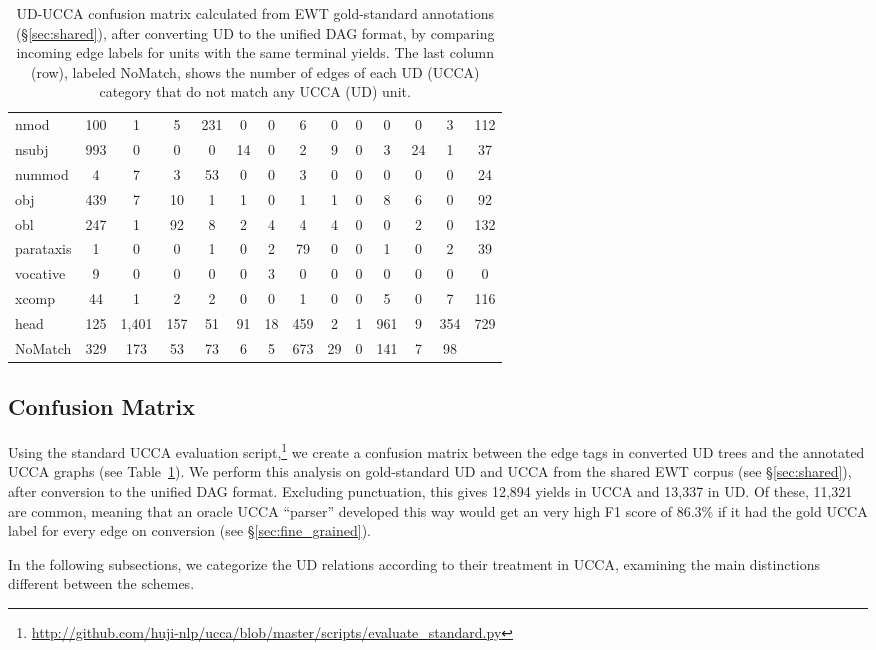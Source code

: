 \documentclass[11pt,a4paper]{article}
\begin{document}
\begin{table}[t]
\begin{tabular}{l|ccccccccccccc}
nmod & 100 & 1 & 5 & 231 & 0 & 0 & 6 & 0 & 0 & 0 & 0 & 3 & 112 \\
nsubj & 993 & 0 & 0 & 0 & 14 & 0 & 2 & 9 & 0 & 3 & 24 & 1 & 37 \\
nummod & 4 & 7 & 3 & 53 & 0 & 0 & 3 & 0 & 0 & 0 & 0 & 0 & 24 \\
obj & 439 & 7 & 10 & 1 & 1 & 0 & 1 & 1 & 0 & 8 & 6 & 0 & 92 \\
obl & 247 & 1 & 92 & 8 & 2 & 4 & 4 & 4 & 0 & 0 & 2 & 0 & 132 \\
parataxis & 1 & 0 & 0 & 1 & 0 & 2 & 79 & 0 & 0 & 1 & 0 & 2 & 39 \\
vocative & 9 & 0 & 0 & 0 & 0 & 3 & 0 & 0 & 0 & 0 & 0 & 0 & 0 \\
xcomp & 44 & 1 & 2 & 2 & 0 & 0 & 1 & 0 & 0 & 5 & 0 & 7 & 116 \\
head & 125 & 1,401 & 157 & 51 & 91 & 18 & 459 & 2 & 1 & 961 & 9 & 354 & 729 \\
{\sc NoMatch} & 329 & 173 & 53 & 73 & 6 & 5 & 673 & 29 & 0 & 141 & 7 & 98
\end{tabular}
\caption{UD-UCCA confusion matrix calculated from EWT
gold-standard annotations (\S\ref{sec:shared}),
after converting UD to the unified DAG format,
by comparing incoming edge labels for units with the same terminal yields.
The last column (row), labeled {\sc NoMatch}, shows the number of edges of each UD (UCCA) category
that do not match any UCCA (UD) unit.
\label{tab:confusion_matrix}}
\end{table}

\subsection{Confusion Matrix}\label{sec:confusion}

Using the standard UCCA evaluation
script,\footnote{\url{http://github.com/huji-nlp/ucca/blob/master/scripts/evaluate_standard.py}}
we create a confusion matrix between the edge tags in converted UD trees
and the annotated UCCA graphs (see Table~\ref{tab:confusion_matrix}).
We perform this analysis on gold-standard UD and UCCA from the shared EWT corpus
(see \S\ref{sec:shared}),
after conversion to the unified DAG format.
Excluding punctuation, this gives 12,894 yields in UCCA and
13,337 in UD.
Of these, 11,321 are common, meaning that an oracle UCCA ``parser'' developed this way
would get an very high F1 score
of 86.3\% if it had the gold UCCA label for every edge on conversion
(see \S\ref{sec:fine_grained}).

In the following subsections, we categorize the UD relations according to their
treatment in UCCA, examining the main distinctions different between the schemes.
\end{document}
